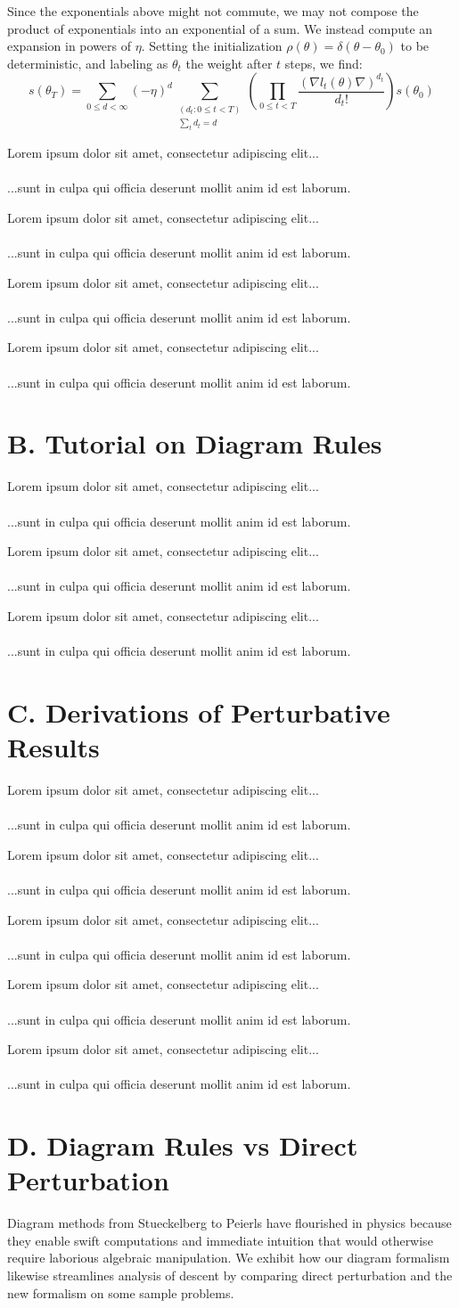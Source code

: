 \documentclass{article}
\newcommand{\lorem}[1]{
    Lorem ipsum dolor sit amet, consectetur adipiscing elit...\\
    \nopagebreak\vspace{#1cm} \ \\
    ...sunt in culpa qui officia deserunt mollit anim id est laborum.
}
\begin{document}
    Since the exponentials above might not commute, we may not compose
    the product of exponentials into an exponential of a sum.  We instead
    compute an expansion in powers of $\eta$.  Setting the initialization
    $\rho(\theta) = \delta(\theta-\theta_0)$ to be deterministic, and labeling
    as $\theta_t$ the weight after $t$ steps, we find:
    \begin{equation}\label{eq:dyson}
        s(\theta_T) =
        \sum_{0\leq d < \infty} (-\eta)^d \sum_{\substack{(d_t: 0\leq t<T) \\ \sum_t d_t = d}}
        \left(\prod_{0 \leq t < T} \frac{(\nabla l_t(\theta) \nabla)^{d_t}}{d_t!}\right) s (\theta_0)
    \end{equation}

    \lorem{3}
    \lorem{3}
    \lorem{3}
    \lorem{3}

\section*{B. Tutorial on Diagram Rules}
    \lorem{3}
    \lorem{3}
    \lorem{3}

\section*{C. Derivations of Perturbative Results}

    \lorem{3}
    \lorem{3}
    \lorem{3}
    \lorem{3}
    \lorem{3}

\section*{D. Diagram Rules vs Direct Perturbation}
    Diagram methods from Stueckelberg to Peierls have flourished in physics
    because they enable swift computations and immediate intuition that would
    otherwise require laborious algebraic manipulation.  We exhibit how our
    diagram formalism likewise streamlines analysis of descent by comparing
    direct perturbation and the new formalism on some sample problems.
\end{document}
